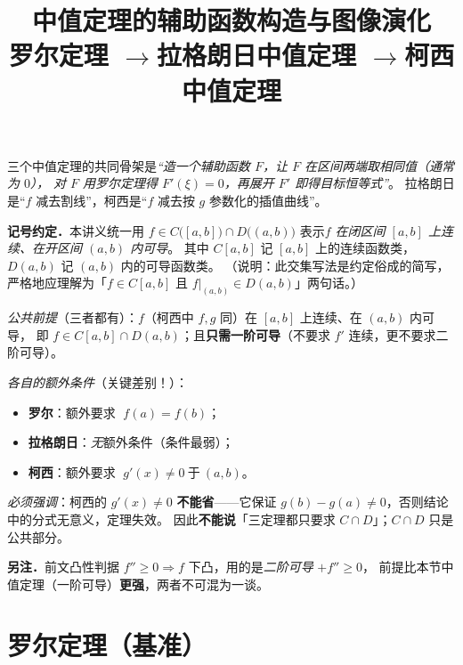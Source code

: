 \documentclass[11pt]{article}
\title{\textbf{中值定理的辅助函数构造与图像演化}\\[2pt]
\large 罗尔定理 \quad$\to$\quad 拉格朗日中值定理 \quad$\to$\quad 柯西中值定理}
\author{}
\date{}
\begin{document}
\maketitle
\vspace{-8mm}

\begin{tcolorbox}[colback=boxbg,colframe=curve!70,title={\bfseries 核心思想}]
三个中值定理的共同骨架是\emph{“造一个辅助函数 $F$，让 $F$ 在区间两端取相同值（通常为 $0$），
对 $F$ 用罗尔定理得 $F'(\xi)=0$，再展开 $F'$ 即得目标恒等式”}。
拉格朗日是“$f$ 减去割线”，柯西是“$f$ 减去按 $g$ 参数化的插值曲线”。
\end{tcolorbox}

\noindent\textbf{记号约定．}本讲义统一用
$f\in C\big([a,b]\big)\cap D\big((a,b)\big)$ 表示\;\emph{$f$ 在闭区间 $[a,b]$ 上连续、在开区间 $(a,b)$ 内可导}。
其中 $C[a,b]$ 记 $[a,b]$ 上的连续函数类，$D(a,b)$ 记 $(a,b)$ 内的可导函数类。
（说明：此交集写法是约定俗成的简写，严格地应理解为「$f\in C[a,b]$ 且 $f|_{(a,b)}\in D(a,b)$」两句话。）

\begin{tcolorbox}[colback=orange!6,colframe=orange!70!black,title={\bfseries 注记：三个定理的条件\textbf{并非完全相同}}]
\emph{公共前提}（三者都有）：$f$（柯西中 $f,g$ 同）在 $[a,b]$ 上连续、在 $(a,b)$ 内可导，
即 $f\in C[a,b]\cap D(a,b)$；且\textbf{只需一阶可导}（不要求 $f'$ 连续，更不要求二阶可导）。

\vspace{1.5mm}
\emph{各自的额外条件}（关键差别！）：
\begin{itemize}
  \item \textbf{罗尔}：额外要求 $\;f(a)=f(b)$；
  \item \textbf{拉格朗日}：\emph{无}额外条件（条件最弱）；
  \item \textbf{柯西}：额外要求 $\;\boxed{g'(x)\neq 0\ \text{于}\ (a,b)}$。
\end{itemize}
\emph{必须强调}：柯西的 $g'(x)\neq0$ \textbf{不能省}——它保证 $g(b)-g(a)\neq0$，否则结论中的分式无意义，定理失效。
因此\textbf{不能说}「三定理都只要求 $C\cap D$」；$C\cap D$ 只是公共部分。
\end{tcolorbox}

\noindent\textbf{另注．}前文凸性判据 $f''\ge0\Rightarrow f$ 下凸，用的是\emph{二阶可导} $+f''\ge0$，
前提比本节中值定理（一阶可导）\textbf{更强}，两者不可混为一谈。

\section{罗尔定理（基准）}
\end{document}
